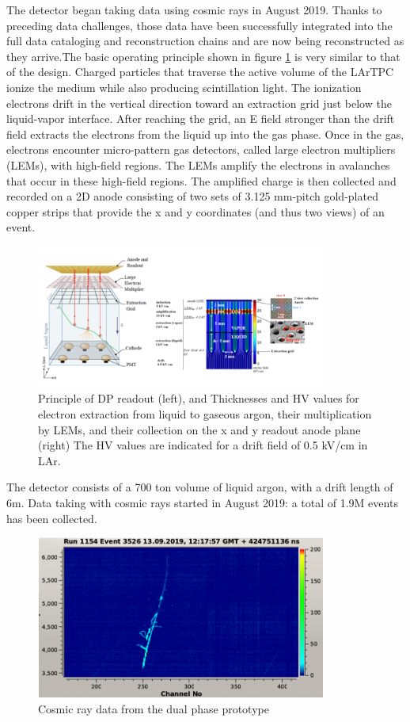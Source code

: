 The  detector began taking data using cosmic rays in August 2019. Thanks to preceding data challenges, those data have been successfully integrated into the full data cataloging and reconstruction chains and are now being reconstructed as they arrive.The basic operating principle shown in figure \ref{dp_principle} is very similar to that of the   design. Charged particles that traverse the active volume of the LArTPC ionize the medium while also producing scintillation
light. The ionization electrons drift in the vertical direction toward an extraction grid just below the liquid-vapor interface. 
After reaching the grid,
an E field stronger than the drift field extracts the electrons from the liquid up into the gas phase.
Once in the gas, electrons encounter micro-pattern gas detectors, called large electron multipliers
(LEMs), with high-field regions. The LEMs amplify the electrons in avalanches that occur in these
high-field regions. The amplified charge is then collected and recorded on a 2D anode consisting
of two sets of 3.125 mm-pitch gold-plated copper strips that provide the x and y coordinates (and
thus two views) of an event.  
\begin{figure}
\centering
\includegraphics[width=0.85\textwidth]{graphics/IntroFigures/Fig_11_protodune-dp-principle.png}
\caption {Principle of DP readout (left), and Thicknesses and HV values for electron extraction from liquid to gaseous argon, their
multiplication by LEMs, and their collection on the x and y readout anode plane (right) The HV values are
indicated for a drift field of 0.5 kV/cm in LAr.}
\label{dp_principle}
\end{figure}
The  detector   consists of a 700 ton volume of liquid argon, with  a drift length of 6m.
Data taking with  cosmic rays  started in August 2019: a total of 1.9M events has been collected. 
\begin{figure}
\centering
\includegraphics[width=0.85\textwidth]{graphics/IntroFigures/Fig_09_protodune-dp-event.png}
\caption {Cosmic ray data from the dual phase prototype}
\label{dpevent}
\end{figure}
